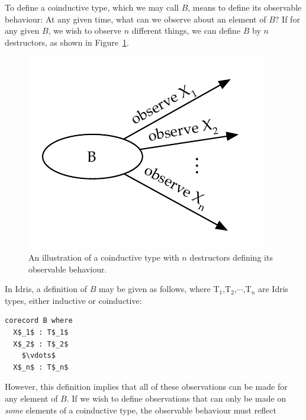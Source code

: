 To define a coinductive type, which we may call $B$, means to define its observable behaviour: At any
given time, what can we observe about an element of $B$? If for any given $B$,
we wish to observe $n$ different things, we can define $B$ by $n$ destructors,
as shown in Figure~\ref{fig:coinductive_type_n_destructors}. 
\begin{figure}[H]
  \centering
  \includegraphics{figures/general_coind_intuition_prod_coinductive}
  \caption{An illustration of a coinductive type with $n$ destructors defining
    its observable behaviour.}
\label{fig:coinductive_type_n_destructors}
\end{figure}
In Idris, a
definition of $B$ may be given as follows, where T$_1$,T$_2$,$\cdots$,T$_n$ are
Idris types, either inductive or coinductive:
\begin{lstlisting}[mathescape]
corecord B where
  X$_1$ : T$_1$
  X$_2$ : T$_2$
    $\vdots$
  X$_n$ : T$_n$
\end{lstlisting}
However, this definition implies that all of these observations can be made for
any element of $B$. If we wish to define observations that can only be made on
\emph{some} elements of a coinductive type, the observable behaviour must
reflect 




